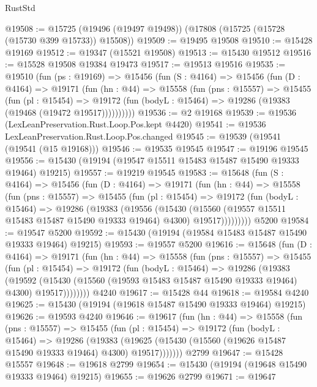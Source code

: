 \begin{lexlean}{RustStd}
\begin{coremodule}
{\begin{coremodule}
{{{{{{{{{{{{{{{{{{{{{{{{{{{{{{{{{{{{{{{{{{{{{{{{{{{{{{{{{{{{@19508 := @15725 (@19496 (@19497 @19498)) (@17808 (@15725 (@15728 (@15730 @399 @15733)) @15508))
@19509 := @19495 @19508
@19510 := @15428 @19169
@19512 := @19347 (@15521 @19508)
@19513 := @15430 @19512
@19516 := @15528 @19508 @19384 @19473
@19517 := @19513 @19516
@19535 := @19510
    (fun (ps : @19169) =>
    @15456
      (fun (S : @4164) =>
      @15456
        (fun (D : @4164) =>
        @19171
          (fun (hn : @44) =>
          @15558
            (fun (pns : @15557) =>
            @15455
              (fun (pl : @15454) =>
              @19172 (fun (bodyL : @15464) => @19286 (@19383 (@19468 (@19472 @19517))))))))))
@19536 := @2 @19168
@19539 := @19536 (LexLeanPreservation.Rust.Loop.Pos.kept @4420)
@19541 := @19536 LexLeanPreservation.Rust.Loop.Pos.changed
@19545 := @19539 (@19541 (@19541 (@15 @19168)))
@19546 := @19535 @19545
@19547 := @19196 @19545
@19556 := @15430 (@19194 (@19547 @15511 @15483 @15487 @15490 @19333 @19464) @19215)
@19557 := @19219 @19545
@19583 := @15648
    (fun (S : @4164) =>
    @15456
      (fun (D : @4164) =>
      @19171
        (fun (hn : @44) =>
        @15558
          (fun (pns : @15557) =>
          @15455
            (fun (pl : @15454) =>
            @19172
              (fun (bodyL : @15464) =>
              @19286
                (@19383
                  (@19556
                    (@15430
                      (@15560 (@19557 @15511 @15483 @15487 @15490 @19333 @19464) @4300)
                      @19517)))))))))
    @5200
@19584 := @19547 @5200
@19592 := @15430 (@19194 (@19584 @15483 @15487 @15490 @19333 @19464) @19215)
@19593 := @19557 @5200
@19616 := @15648
    (fun (D : @4164) =>
    @19171
      (fun (hn : @44) =>
      @15558
        (fun (pns : @15557) =>
        @15455
          (fun (pl : @15454) =>
          @19172
            (fun (bodyL : @15464) =>
            @19286
              (@19383
                (@19592
                  (@15430 (@15560 (@19593 @15483 @15487 @15490 @19333 @19464) @4300) @19517))))))))
    @4240
@19617 := @15428 @44
@19618 := @19584 @4240
@19625 := @15430 (@19194 (@19618 @15487 @15490 @19333 @19464) @19215)
@19626 := @19593 @4240
@19646 := @19617
    (fun (hn : @44) =>
    @15558
      (fun (pns : @15557) =>
      @15455
        (fun (pl : @15454) =>
        @19172
          (fun (bodyL : @15464) =>
          @19286
            (@19383
              (@19625 (@15430 (@15560 (@19626 @15487 @15490 @19333 @19464) @4300) @19517)))))))
    @2799
@19647 := @15428 @15557
@19648 := @19618 @2799
@19654 := @15430 (@19194 (@19648 @15490 @19333 @19464) @19215)
@19655 := @19626 @2799
@19671 := @19647
}}}}}}}}}}}}}}}}}}}}}}}}}}}}}}}}}}}}}}}}}}}}}}}}}}}}}}}}}}}}
\end{coremodule}}
\end{coremodule}
\end{lexlean}
